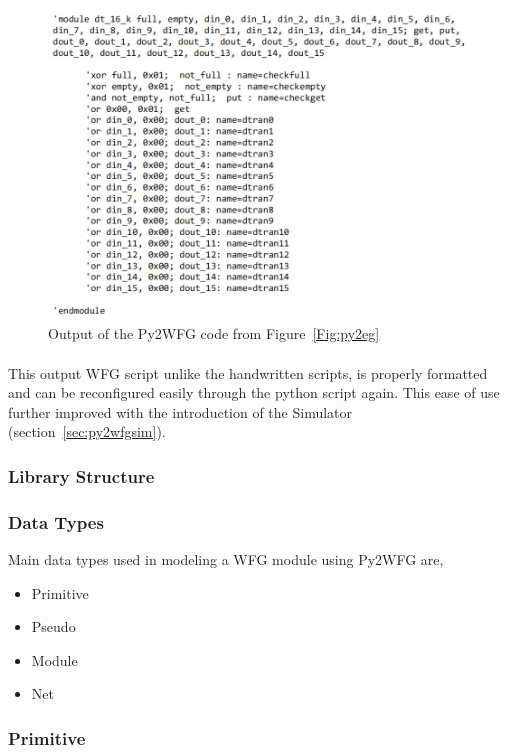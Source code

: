 \begin{figure}[h]
    \centering
    \includegraphics[trim=0cm 0cm 0cm 0cm, clip=true,scale=0.5]{figures/wfg_out.jpg}
    \caption{Output of the Py2WFG code from Figure~\ref{Fig:py2eg}\label{Fig:wfgout}}\vspace{-4mm}
    \end{figure}

\paragraph{}
This output WFG script unlike the handwritten scripts, is properly formatted and can be reconfigured easily through the python script again. This ease of use further improved with the introduction of the Simulator (section~\ref{sec:py2wfgsim}).

\subsubsection{Library Structure}
\subsubsection*{Data Types}
Main data types used in modeling a WFG module using Py2WFG are,
\begin{itemize}
    \item Primitive
    \item Pseudo
    \item Module
    \item Net
\end{itemize}

\subsubsection*{Primitive}
